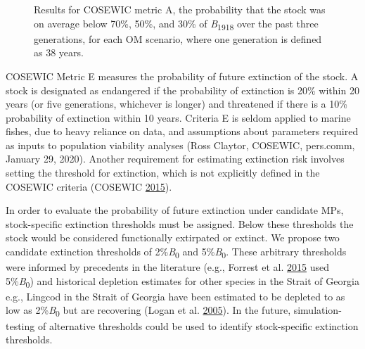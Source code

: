 \documentclass[11pt]{book}
\begin{document}
\begin{figure}[htb]

{\centering {} 

}

\caption{Results for COSEWIC metric A, the probability that the stock was on average below 70\%, 50\%, and 30\% of \emph{B}\textsubscript{1918} over the past three generations, for each OM scenario, where one generation is defined as 38 years.}\label{fig:cosewic-metrics}
\end{figure}
\hypertarget{extinction-risk---cosewic-metric-e}{%
\label{extinction-risk---cosewic-metric-e}}

COSEWIC Metric E measures the probability of future extinction of the stock. A stock is designated as endangered if the probability of extinction is 20\% within 20 years (or five generations, whichever is longer) and threatened if there is a 10\% probability of extinction within 10 years. Criteria E is seldom applied to marine fishes, due to heavy reliance on data, and assumptions about parameters required as inputs to population viability analyses (Ross Claytor, COSEWIC, pers.comm, January 29, 2020). Another requirement for estimating extinction risk involves setting the threshold for extinction, which is not explicitly defined in the COSEWIC criteria (COSEWIC \protect\hyperlink{ref-cosewic2015}{2015}).

In order to evaluate the probability of future extinction under candidate MPs, stock-specific extinction thresholds must be assigned. Below these thresholds the stock would be considered functionally extirpated or extinct. We propose two candidate extinction thresholds of 2\%\emph{B}\textsubscript{0} and 5\%\emph{B}\textsubscript{0}. These arbitrary thresholds were informed by precedents in the literature (e.g., Forrest et al. \protect\hyperlink{ref-forrest2015}{2015} used 5\%\emph{B}\textsubscript{0}) and historical depletion estimates for other species in the Strait of Georgia e.g., Lingcod in the Strait of Georgia have been estimated to be depleted to as low as 2\%\emph{B}\textsubscript{0} but are recovering (Logan et al. \protect\hyperlink{ref-logan2005}{2005}). In the future, simulation-testing of alternative thresholds could be used to identify stock-specific extinction thresholds.
\end{document}
